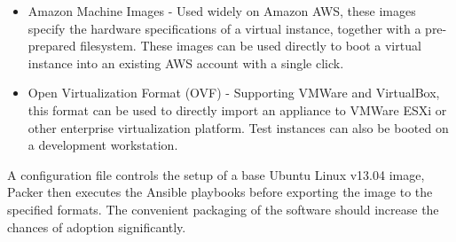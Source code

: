 \documentclass{cshonours}
\begin{document}
\begin{itemize}
  \item Amazon Machine Images - Used widely on Amazon AWS, these images specify the hardware specifications of a virtual instance, together with a pre-prepared filesystem. These images can be used directly to boot a virtual instance into an existing AWS account with a single click.
  \item Open Virtualization Format (OVF) - Supporting VMWare and VirtualBox, this format can be used to directly import an appliance to VMWare ESXi or other enterprise virtualization platform. Test instances can also be booted on a development workstation.
\end{itemize}

A configuration file controls the setup of a base Ubuntu Linux v13.04 image, Packer then executes the Ansible playbooks before exporting the image to the specified formats. The convenient packaging of the software should increase the chances of adoption significantly.

\pagebreak
\end{document}
